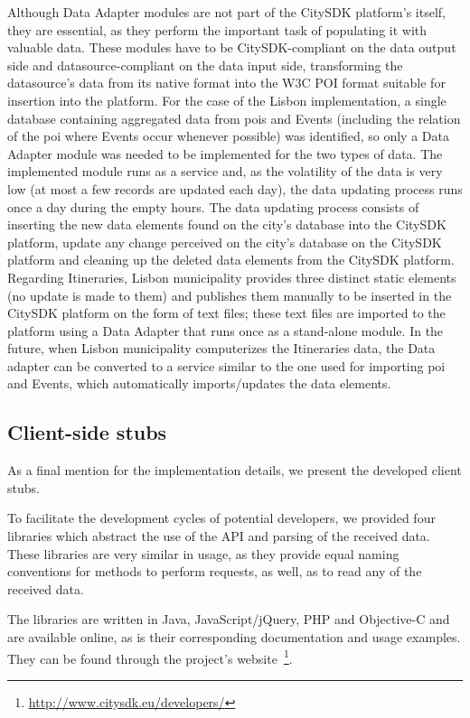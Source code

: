 \documentclass[times,doublespace]{ettauth}%
\begin{document}
Although Data Adapter modules are not part of the CitySDK platform's itself, they are essential, as they perform the important task of populating it with valuable data. 
These modules have to be CitySDK-compliant on the data output side and datasource-compliant on the data input side, transforming the datasource's data from its native format into the W3C POI format suitable for insertion into the platform. 
For the case of the Lisbon implementation, a single database containing aggregated data from \acp{poi} and Events (including the relation of the \ac{poi} where Events occur whenever possible) was identified, so only a Data Adapter module was needed to be implemented for the two types of data. 
The implemented module runs as a service and, as the volatility of the data is very low (at most a few records are updated each day), the data updating process runs once a day during the empty hours. 
The data updating process consists of inserting the new data elements found on the city's database into the CitySDK platform, update any change perceived on the city's database on the CitySDK platform and cleaning up the deleted data elements from the CitySDK platform. 
Regarding Itineraries, Lisbon municipality provides three distinct static elements (no update is made to them) and publishes them manually to be inserted in the CitySDK platform on the form of text files; these text files are imported to the platform using a Data Adapter that runs once as a stand-alone module. 
In the future, when Lisbon municipality computerizes the Itineraries data, the Data adapter can be converted to a service similar to the one used for importing \ac{poi} and Events, which automatically imports/updates the data elements.

\subsection{Client-side stubs}
As a final mention for the implementation details, we present the developed client stubs. 

To facilitate the development cycles of potential developers, we provided four libraries which abstract the use of the API and parsing of the received data. These libraries are very similar in usage, as they provide equal naming conventions for methods to perform requests, as well, as to read any of the received data.

The libraries are written in Java, JavaScript/jQuery, PHP and Objective-C and are available online, as is their corresponding documentation and usage examples. They can be found through the project's website~\footnote{\url{http://www.citysdk.eu/developers/}}.
\end{document}
